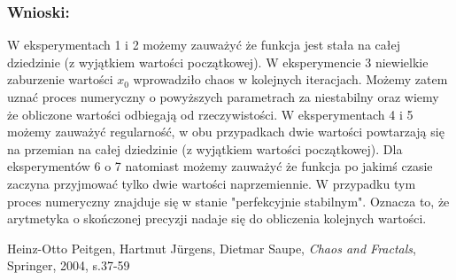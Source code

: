 \documentclass[12pt]{article}
\begin{document}
\subsubsection*{Wnioski:}
W eksperymentach 1 i 2 możemy zauważyć że funkcja jest stała na całej dziedzinie (z wyjątkiem wartości początkowej). W eksperymencie 3 niewielkie zaburzenie wartości $x_0$ wprowadziło chaos w kolejnych iteracjach. Możemy zatem uznać proces numeryczny o powyższych parametrach za niestabilny oraz wiemy że obliczone wartości odbiegają od rzeczywistości. W eksperymentach 4 i 5 możemy zauważyć regularność, w obu przypadkach dwie wartości powtarzają się na przemian na całej dziedzinie (z wyjątkiem wartości początkowej). Dla eksperymentów 6 o 7 natomiast możemy zauważyć że funkcja po jakimś czasie zaczyna przyjmować tylko dwie wartości naprzemiennie. W przypadku tym proces numeryczny znajduje się w stanie "perfekcyjnie stabilnym". \cite{chaos} Oznacza to, że arytmetyka o skończonej precyzji nadaje się do obliczenia kolejnych wartości.

\begin{thebibliography}{1}
Heinz-Otto Peitgen, Hartmut Jürgens, Dietmar Saupe,
\textit{Chaos and Fractals},
Springer, 2004, s.37-59
\end{thebibliography}
\end{document}
